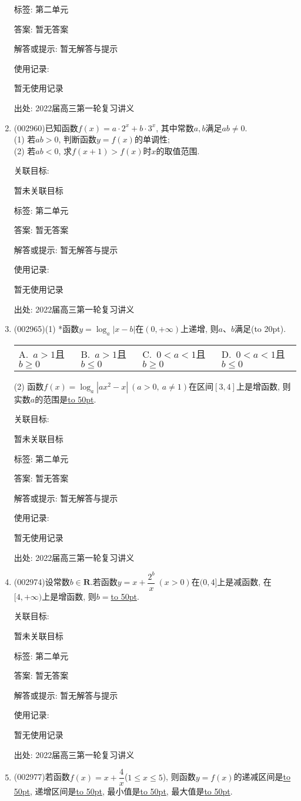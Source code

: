 \documentclass[10pt,a4paper]{article}
\newcommand{\blank}[1]{\underline{\hbox to #1pt{}}}
\newcommand{\bracket}[1]{(\hbox to #1pt{})}
\newcommand{\fourch}[4]{\par\begin{tabular}{p{.23\textwidth}p{.23\textwidth}p{.23\textwidth}p{.23\textwidth}}
A.~#1 &B.~#2& C.~#3& D.~#4
\end{tabular}}
\begin{document}
\begin{enumerate}[1.]
标签: 第二单元

答案: 暂无答案

解答或提示: 暂无解答与提示

使用记录:

暂无使用记录


出处: 2022届高三第一轮复习讲义
\item { (002960)}已知函数$f(x)=a\cdot 2^x+b\cdot 3^x$, 其中常数$a,b$满足$ab\ne 0$.\\
(1) 若$ab>0$, 判断函数$y=f(x)$的单调性;\\
(2) 若$ab<0$, 求$f(x+1)>f(x)$时$x$的取值范围.


关联目标:

暂未关联目标



标签: 第二单元

答案: 暂无答案

解答或提示: 暂无解答与提示

使用记录:

暂无使用记录


出处: 2022届高三第一轮复习讲义
\item { (002965)}(1) *函数$y=\log_a|x-b|$在$(0,+\infty)$上递增, 则$a$、$b$满足\bracket{20}.
\fourch{$a>1$且$b\ge 0$}{$a>1$且$b\le 0$}{$0<a<1$且$b\ge 0$}{$0<a<1$且$b\le 0$}
(2) 函数$f(x)=\log_a|ax^2-x| \ (a>0,\ a\ne 1)$在区间$[3,4]$上是增函数, 则实数$a$的范围是\blank{50}.


关联目标:

暂未关联目标



标签: 第二单元

答案: 暂无答案

解答或提示: 暂无解答与提示

使用记录:

暂无使用记录


出处: 2022届高三第一轮复习讲义
\item { (002974)}设常数$b\in \mathbf{R}$.若函数$y=x+\dfrac{2^b}x \ (x>0)$在$(0,4]$上是减函数, 在$[4,+\infty)$上是增函数, 则$b=$\blank{50}.


关联目标:

暂未关联目标



标签: 第二单元

答案: 暂无答案

解答或提示: 暂无解答与提示

使用记录:

暂无使用记录


出处: 2022届高三第一轮复习讲义
\item { (002977)}若函数$f(x)=x+\dfrac 4x$($1\le x\le 5$), 则函数$y=f(x)$的递减区间是\blank{50}, 递增区间是\blank{50}, 最小值是\blank{50}, 最大值是\blank{50}.



\end{enumerate}
\end{document}
